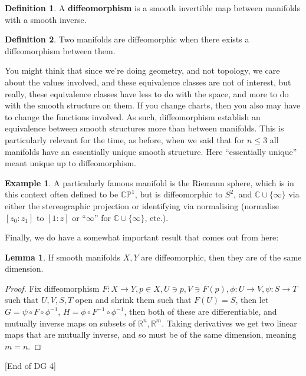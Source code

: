 \documentclass{article}
\theoremstyle{definition}
\newtheorem{definition}{Definition}
\newtheorem{lemma}{Lemma}
\newtheorem{example}{Example}
\begin{document}
\begin{definition}
  A \textbf{diffeomorphism} is a smooth invertible map between manifolds with a
  smooth inverse.
\end{definition}

\begin{definition}
  Two manifolds are diffeomorphic when there exists a diffeomorphism between
  them.
\end{definition}

You might think that since we're doing geometry, and not topology, we care about
the values involved, and these equivalence classes are not of interest, but
really, these equivalence classes have less to do with the space, and more to do
with the smooth structure on them. If you change charts, then you also may have
to change the functions involved. As such, diffeomorphism establish an
equivalence between smooth structures more than between manifolds. This is
particularly relevant for the time, as before, when we said that for $n \leq 3$
all manifolds have an essentially unique smooth structure. Here ``essentially
unique'' meant unique up to diffeomorphism.

\begin{example}
  A particularly famous manifold is the Riemann sphere, which is in this context
  often defined to be $\mathbb{CP}^1$, but is diffeomorphic to $S^2$, and
  $\mathbb{C} \cup \{\infty\}$ via either the stereographic projection or
  identifying via normalising (normalise $[z_0 : z_1]$ to $[1 : z]$ or
  ``$\infty$'' for $\mathbb{C} \cup \{\infty\}$, etc.).
\end{example}

Finally, we do have a somewhat important result that comes out from here:

\begin{lemma}
  If smooth manifolds $X, Y$ are diffeomorphic, then they are of the same
  dimension.
\end{lemma}
\begin{proof}
  Fix diffeomorphism $F: X \to Y, p \in X, U \ni p, V \ni F(p), \phi : U \to V,
  \psi : S \to T$ such that $U, V, S, T$ open and shrink them such that $F(U) =
  S$, then let $G = \psi \circ F \circ \phi^{-1}$, $H = \phi \circ F^{-1} \circ
  \phi^{-1}$, then both of these are differentiable, and mutually inverse maps
  on subsets of $\mathbb{R}^n, \mathbb{R}^m$. Taking derivatives we get two
  linear maps that are mutually inverse, and so must be of the same dimension,
  meaning $m = n$.
\end{proof}
[End of DG 4]
\end{document}
